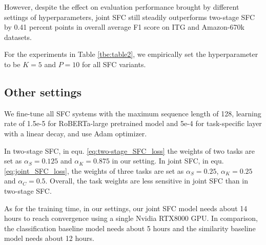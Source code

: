 However, despite the effect on evaluation performance brought by different settings of hyperparameters, joint SFC still steadily outperforms two-stage SFC by 0.41 percent points in overall average F1 score on ITG and Amazon-670k datasets.

For the experiments in Table \ref{tbe:table2}, we empirically set the hyperparameter to be $K=5$ and $P=10$ for all SFC variants. 

\subsection{Other settings}
We fine-tune all SFC systems with the maximum sequence length of 128, learning rate of 1.5e-5 for RoBERTa-large pretrained model and 5e-4 for task-specific layer with a linear decay, and use Adam optimizer.

In two-stage SFC, in equ. \ref{eq:two-stage_SFC_loss} the weights of two tasks are set as $\alpha_S=0.125$ and $\alpha_K=0.875$ in our setting. 
In joint SFC, in equ. \ref{eq:joint_SFC_loss}, the weights of three tasks are set as $\alpha_S=0.25$, $\alpha_K=0.25$ and $\alpha_C=0.5$. 
Overall, the task weights are less sensitive in joint SFC than in two-stage SFC.

As for the training time, in our settings, our joint SFC model needs about 14 hours to reach convergence using a single Nvidia RTX8000 GPU. 
In comparison, the classification baseline model needs about 5 hours and the similarity baseline model needs about 12 hours.

